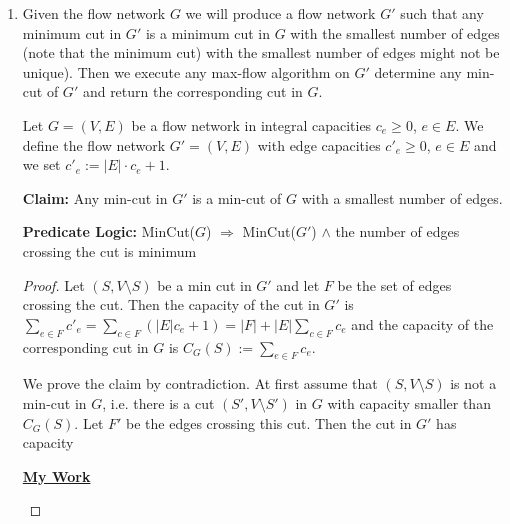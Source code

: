 \documentclass[12pt]{article}
\begin{document}
\begin{enumerate}[1.]
    \item

    \bigskip
    \setcounter{equation}{0}
    \bigskip

    Given the flow network $G$ we will produce a flow network $G'$ such that any minimum
    cut in $G'$ is a minimum cut in $G$ with the smallest number of edges (note that the minimum cut)
    with the smallest number of edges might not be unique). Then we execute any max-flow algorithm on
    $G'$ determine any min-cut of $G'$ and return the corresponding cut in $G$.

    \bigskip

    Let $G = (V,E)$ be a flow network in integral capacities $c_e \geq 0$, $e \in E$.
    We define the flow network $G' = (V,E)$ with edge capacities $c'_e \geq 0$, $e \in E$
    and we set $c'_e := \lvert E \rvert \cdot c_e + 1$.

    \bigskip

    \textbf{Claim:} Any min-cut in $G'$ is a min-cut of $G$ with a smallest number of edges.

    \bigskip

    \textbf{Predicate Logic:} MinCut($G$) $\Rightarrow$ MinCut($G'$) $\land$ the number of edges crossing the cut is minimum

    \bigskip

    \begin{proof}

    Let $(S,V \setminus S)$ be a min cut in $G'$ and let $F$ be the set of edges
    crossing the cut. Then the capacity of the cut in $G'$ is $\sum\limits_{e \in F} c'_e = \sum\limits_{c \in F} (\lvert E \rvert c_e + 1)
    = \lvert F \rvert + \lvert E \rvert \sum\limits_{c \in F} c_e$ and the capacity of the
    corresponding cut in $G$ is $C_G(S) := \sum\limits_{e \in F} c_e$.

    \bigskip

    We prove the claim by contradiction. At first assume that $(S, V \setminus S)$ is not
    a min-cut in $G$, i.e. there is a cut $(S', V \setminus S')$ in $G$ with capacity smaller than
    $C_G(S)$. Let $F'$ be the edges crossing this cut. Then the cut in $G'$ has capacity

    \bigskip

    \begin{mdframed}
    \underline{\textbf{My Work}}


\end{mdframed}
\end{proof}
\end{enumerate}
\end{document}
